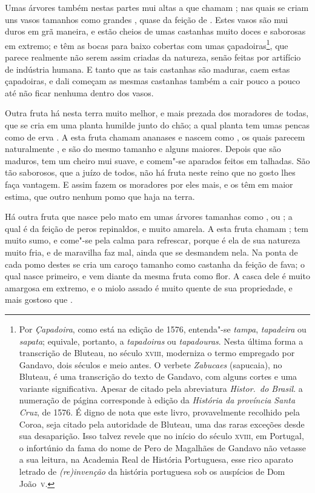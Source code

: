 Umas árvores também nestas partes mui altas a que chamam ; nas 
quais se criam uns vasos tamanhos como grandes , quase da feição
de . Estes vasos são mui duros em grã maneira, e estão
cheios de umas castanhas muito doces e saborosas em extremo; e têm as
bocas para baixo cobertas com umas çapadoiras\footnote{ Por
\textit{Çapadoira}, como está na edição de 1576, entenda"-se
\textit{tampa}, \textit{tapadeira} ou \textit{sapata}; equivale, portanto, a
\textit{tapadoiras} ou  \textit{tapadouras}. Nesta última forma a
transcrição de Bluteau, no século \textsc{xviii}, moderniza o termo empregado
por Gandavo, dois séculos e meio antes. O verbete \textit{Zabucaes} (sapucaia), no
Bluteau, é uma transcrição do texto de Gandavo, com alguns cortes e uma variante
significativa. Apesar de citado pela abreviatura \textit{Histor.~do
Brasil}. a numeração de página corresponde à edição da \textit{História
da província Santa Cruz}, de 1576. É digno de nota que este livro,
provavelmente recolhido pela Coroa, seja citado pela autoridade de
Bluteau, uma das raras exceções desde sua desaparição. Isso
talvez revele que no início do século \textsc{xviii}, em Portugal, o infortúnio
da fama do nome de Pero de Magalhães de Gandavo não vetasse a sua
leitura, na Academia Real de História Portuguesa, esse rico aparato
letrado de \textit{(re)invenção} da história portuguesa sob os
auspícios de Dom \mbox{João \textsc{v}}.}, que parece realmente não 
serem assim criadas da natureza, senão feitas por
artifício de indústria humana. E tanto que as tais castanhas são
maduras, caem estas çapadoiras, e dali começam as mesmas castanhas
também a cair pouco a pouco até não ficar nenhuma dentro dos vasos. 

Outra fruta há nesta terra muito melhor, e mais prezada dos moradores
de todas, que se cria em uma planta humilde junto do chão; a qual planta
tem umas pencas como de erva . A esta fruta chamam ananases e 		%
nascem como , os quais parecem naturalmente , e são do
mesmo tamanho e alguns maiores. Depois que são maduros, tem um cheiro
mui suave, e comem"-se aparados feitos em talhadas. São tão saborosos,
que a juízo de todos, não há fruta neste reino que no gosto lhes faça
vantagem. E assim fazem os moradores por eles mais, e os têm em maior
estima, que outro nenhum pomo que haja na terra.

Há outra fruta que nasce pelo mato em umas árvores tamanhas como
, ou ; a qual é da feição de peros repinaldos, e muito	%
amarela. A esta fruta chamam ; tem muito sumo, e come"-se pela
calma para refrescar, porque é ela de sua natureza muito fria, e de
maravilha faz mal, ainda que se desmandem nela. Na ponta de cada pomo
destes se cria um caroço tamanho como castanha da feição de fava; o
qual nasce primeiro, e vem diante da mesma fruta como flor. A casca
dele é muito amargosa em extremo, e o miolo assado é muito quente de
sua propriedade, e mais gostoso que .

